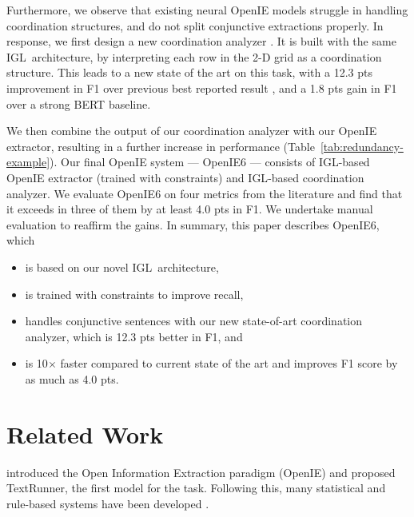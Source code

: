\documentclass[11pt,a4paper]{article}
\newcommand{\shortname}{{\scshape IGL}}
\begin{document}
Furthermore, we observe that existing neural OpenIE models struggle in handling coordination structures, and do not split conjunctive extractions properly.  In response, we first design a new coordination analyzer \cite{ficler&goldberg16b}. It is built with the same \shortname\ architecture, by interpreting each row in the 2-D grid as a coordination structure. This leads to a new state of the art on this task, with a 12.3 pts improvement in F1 over previous best reported result \cite{teranishi+19}, and a 1.8 pts gain in F1 over a strong BERT baseline. 




We then combine the output of our coordination analyzer with our OpenIE extractor, resulting in a further increase in performance (Table~\ref{tab:redundancy-example}). 
Our final OpenIE system --- OpenIE6 --- consists of \shortname-based OpenIE extractor (trained with constraints) and \shortname-based coordination analyzer. We evaluate OpenIE6 on four metrics from the literature and find that it exceeds in three of them by at least 4.0 pts in F1. We undertake manual evaluation to reaffirm the gains. In summary, this paper describes OpenIE6, which
\begin{itemize}
    \item is based on our novel \shortname\  architecture,
    \item is trained with constraints to improve recall,
    \item handles conjunctive sentences with our new state-of-art coordination analyzer, which is 12.3 pts better in F1, and
    \item is 10$\times$ faster compared to current state of the art and improves F1 score by as much as 4.0 pts.
\end{itemize}























 
\section{Related Work}
\label{sec:related}
\citet{banko&al07} introduced the Open Information Extraction  paradigm (OpenIE) and proposed TextRunner, the first model for the task. Following this, many statistical and rule-based systems have been developed  \cite{Fader&al11,etzioni-ijcai11, christensen&al11, Mausam&al12,  corro&al13, angeli&al15, pal&al16, Stanovsky&al2016, saha&al2017,  gashteovski&al17,  saha&mausam18, christina&al18}. 
\end{document}
